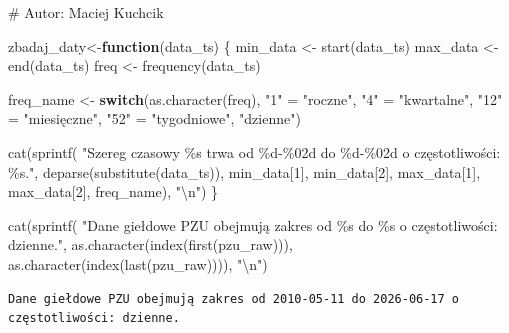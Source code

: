 \documentclass[
  polish,
  letterpaper,
  DIV=11,
  numbers=noendperiod]{scrartcl}
\newenvironment{Shaded}{\begin{snugshade}}{\end{snugshade}}
\newcommand{\CommentTok}[1]{\textcolor[rgb]{0.37,0.37,0.37}{#1}}
\newcommand{\ControlFlowTok}[1]{\textcolor[rgb]{0.00,0.23,0.31}{\textbf{#1}}}
\newcommand{\DecValTok}[1]{\textcolor[rgb]{0.68,0.00,0.00}{#1}}
\newcommand{\FunctionTok}[1]{\textcolor[rgb]{0.28,0.35,0.67}{#1}}
\newcommand{\NormalTok}[1]{\textcolor[rgb]{0.00,0.23,0.31}{#1}}
\newcommand{\OtherTok}[1]{\textcolor[rgb]{0.00,0.23,0.31}{#1}}
\newcommand{\SpecialCharTok}[1]{\textcolor[rgb]{0.37,0.37,0.37}{#1}}
\newcommand{\StringTok}[1]{\textcolor[rgb]{0.13,0.47,0.30}{#1}}
\begin{document}
\begin{Shaded}
\begin{Highlighting}[]
\CommentTok{\# Autor: Maciej Kuchcik}

\NormalTok{zbadaj\_daty}\OtherTok{\textless{}{-}}\ControlFlowTok{function}\NormalTok{(data\_ts) \{}
\NormalTok{  min\_data }\OtherTok{\textless{}{-}} \FunctionTok{start}\NormalTok{(data\_ts)}
\NormalTok{  max\_data }\OtherTok{\textless{}{-}} \FunctionTok{end}\NormalTok{(data\_ts)}
\NormalTok{  freq }\OtherTok{\textless{}{-}} \FunctionTok{frequency}\NormalTok{(data\_ts)}
  
\NormalTok{  freq\_name }\OtherTok{\textless{}{-}} \ControlFlowTok{switch}\NormalTok{(}\FunctionTok{as.character}\NormalTok{(freq),}
                      \StringTok{"1"}  \OtherTok{=} \StringTok{"roczne"}\NormalTok{,}
                      \StringTok{"4"}  \OtherTok{=} \StringTok{"kwartalne"}\NormalTok{,}
                      \StringTok{"12"} \OtherTok{=} \StringTok{"miesięczne"}\NormalTok{,}
                      \StringTok{"52"} \OtherTok{=} \StringTok{"tygodniowe"}\NormalTok{,}
                      \StringTok{"dzienne"}\NormalTok{)}


\FunctionTok{cat}\NormalTok{(}\FunctionTok{sprintf}\NormalTok{(}
  \StringTok{"Szereg czasowy \textquotesingle{}\%s\textquotesingle{} trwa od \%d{-}\%02d do \%d{-}\%02d o częstotliwości: \%s."}\NormalTok{,}
              \FunctionTok{deparse}\NormalTok{(}\FunctionTok{substitute}\NormalTok{(data\_ts)), }
\NormalTok{              min\_data[}\DecValTok{1}\NormalTok{], min\_data[}\DecValTok{2}\NormalTok{], }
\NormalTok{              max\_data[}\DecValTok{1}\NormalTok{], max\_data[}\DecValTok{2}\NormalTok{], }
\NormalTok{              freq\_name), }\StringTok{"}\SpecialCharTok{\textbackslash{}n}\StringTok{"}\NormalTok{)}
\NormalTok{\}}

\FunctionTok{cat}\NormalTok{(}\FunctionTok{sprintf}\NormalTok{(}
  \StringTok{"Dane giełdowe PZU obejmują zakres od \%s do \%s o częstotliwości: dzienne."}\NormalTok{,}
            \FunctionTok{as.character}\NormalTok{(}\FunctionTok{index}\NormalTok{(}\FunctionTok{first}\NormalTok{(pzu\_raw))), }
            \FunctionTok{as.character}\NormalTok{(}\FunctionTok{index}\NormalTok{(}\FunctionTok{last}\NormalTok{(pzu\_raw)))), }\StringTok{"}\SpecialCharTok{\textbackslash{}n}\StringTok{"}\NormalTok{)}
\end{Highlighting}
\end{Shaded}

\begin{verbatim}
Dane giełdowe PZU obejmują zakres od 2010-05-11 do 2026-06-17 o częstotliwości: dzienne. 
\end{verbatim}
\end{document}
